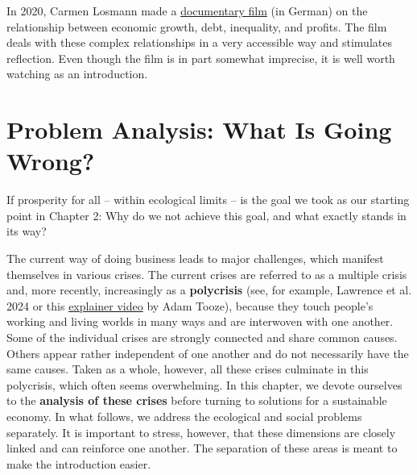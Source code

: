 \documentclass[
  british,
  a4paper,
  DIV=11,
  numbers=noendperiod,
  oneside,
  openany]{scrreprt}
\begin{document}
\begin{tcolorbox}[enhanced jigsaw, arc=.35mm, bottomrule=.15mm, bottomtitle=1mm, breakable, colback=white, colbacktitle=quarto-callout-note-color!10!white, colframe=quarto-callout-note-color-frame, coltitle=black, left=2mm, leftrule=.75mm, opacityback=0, opacitybacktitle=0.6, rightrule=.15mm, title={Further material -- Oeconomia: Economic growth, debt, inequality, and
profits}, titlerule=0mm, toprule=.15mm, toptitle=1mm]

In 2020, Carmen Losmann made a
\href{https://www.3sat.de/film/dokumentarfilm/oeconomia-100.html}{documentary
film} (in German) on the relationship between economic growth, debt,
inequality, and profits. The film deals with these complex relationships
in a very accessible way and stimulates reflection. Even though the film
is in part somewhat imprecise, it is well worth watching as an
introduction.

\end{tcolorbox}

\chapter{Problem Analysis: What Is Going
Wrong?}\label{problem-analysis-what-is-going-wrong}

\begin{tcolorbox}[enhanced jigsaw, arc=.35mm, bottomrule=.15mm, bottomtitle=1mm, breakable, colback=white, colbacktitle=quarto-callout-note-color!10!white, colframe=quarto-callout-note-color-frame, coltitle=black, left=2mm, leftrule=.75mm, opacityback=0, opacitybacktitle=0.6, rightrule=.15mm, title={Guiding question}, titlerule=0mm, toprule=.15mm, toptitle=1mm]

If prosperity for all -- within ecological limits -- is the goal we took
as our starting point in Chapter 2: Why do we not achieve this goal, and
what exactly stands in its way?

\end{tcolorbox}

The current way of doing business leads to major challenges, which
manifest themselves in various crises. The current crises are referred
to as a multiple crisis and, more recently, increasingly as a
\textbf{polycrisis} (see, for example, Lawrence et al. 2024 or this
\href{https://www.weforum.org/videos/experts-explain-adam-tooze-what-is-the-polycrisis/}{explainer
video} by Adam Tooze), because they touch people's working and living
worlds in many ways and are interwoven with one another. Some of the
individual crises are strongly connected and share common causes. Others
appear rather independent of one another and do not necessarily have the
same causes. Taken as a whole, however, all these crises culminate in
this polycrisis, which often seems overwhelming. In this chapter, we
devote ourselves to the \textbf{analysis of these crises} before turning
to solutions for a sustainable economy. In what follows, we address the
ecological and social problems separately. It is important to stress,
however, that these dimensions are closely linked and can reinforce one
another. The separation of these areas is meant to make the introduction
easier.
\end{document}
